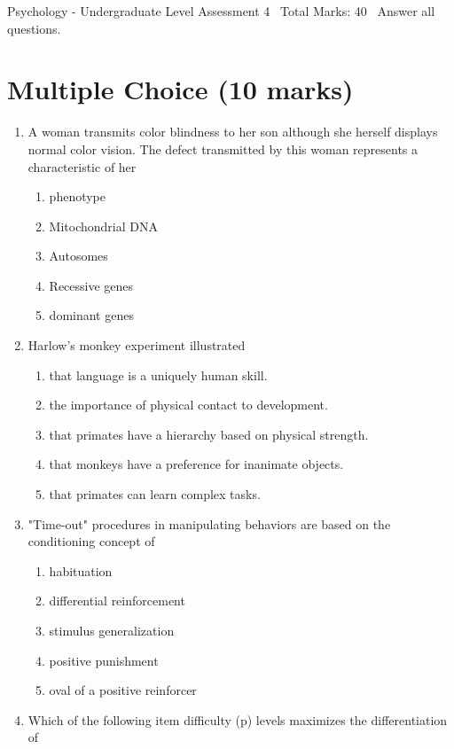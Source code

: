 \documentclass[12pt]{article}
\begin{document}
\begin{center}
Psychology - Undergraduate Level Assessment 4 \
Total Marks: 40 \
Answer all questions.
\end{center}

\section*{Multiple Choice (10 marks)}
\begin{enumerate}[label=\arabic*.]
\item A woman transmits color blindness to her son although she herself displays normal color
vision. The defect transmitted by this woman represents a characteristic of her
\begin{enumerate}[label=(\alph*)]
    \item phenotype
    \item Mitochondrial DNA
    \item Autosomes
    \item Recessive genes
    \item dominant genes
\end{enumerate}
\item Harlow's monkey experiment illustrated
\begin{enumerate}[label=(\alph*)]
    \item that language is a uniquely human skill.
    \item the importance of physical contact to development.
    \item that primates have a hierarchy based on physical strength.
    \item that monkeys have a preference for inanimate objects.
    \item that primates can learn complex tasks.
\end{enumerate}
\item "Time-out" procedures in manipulating behaviors are based on the conditioning concept of
\begin{enumerate}[label=(\alph*)]
    \item habituation
    \item differential reinforcement
    \item stimulus generalization
    \item positive punishment
    \item oval of a positive reinforcer
\end{enumerate}
\item Which of the following item difficulty (p) levels maximizes the differentiation of

\end{enumerate}
\end{document}

